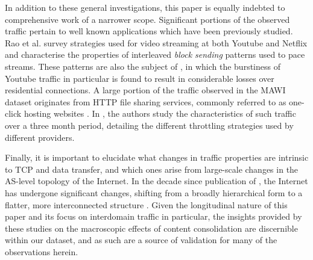 In addition to these general investigations, this paper is equally indebted to comprehensive work of a narrower scope.
Significant portions of the observed traffic pertain to well known applications which have been previously studied.
Rao et al. \cite{Rao:2011p547} survey strategies used for video streaming at both Youtube and Netflix and characterise the properties of interleaved \emph{block sending} patterns used to pace streams.
These patterns are also the subject of \cite{Alcock:2011p575}, in which the burstiness of Youtube traffic in particular is found to result in considerable losses over residential connections.
A large portion of the traffic observed in the MAWI dataset originates from HTTP file sharing services, commonly referred to as one-click hosting websites \cite{oneclick1}.
In \cite{SanjuasCuxart:2012p588}, the authors study the characteristics of such traffic over a three month period, detailing the different throttling strategies used by different providers.

Finally, it is important to elucidate what changes in traffic properties are intrinsic to TCP and data transfer, and which ones arise from large-scale changes in the AS-level topology of the Internet. In the decade since publication of \cite{Zhang:2002p85}, the Internet has undergone significant changes, shifting from a broadly hierarchical form to a flatter, more interconnected structure \cite{Labovitz:2010p175,Ager:2012p567}.
Given the longitudinal nature of this paper and its focus on interdomain traffic in particular, the insights provided by these studies on the macroscopic effects of content consolidation are discernible within our dataset, and as such are a source of validation for many of the observations herein.
